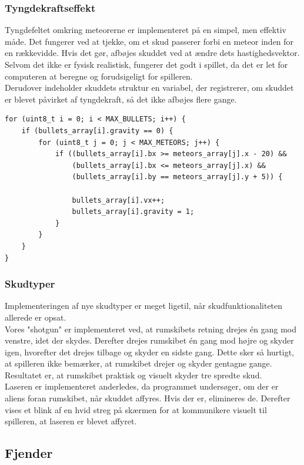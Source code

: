 \subsubsection{Tyngdekraftseffekt}
Tyngdefeltet omkring meteorerne er implementeret på en simpel, men effektiv måde. Det fungerer ved at tjekke, om et skud passerer forbi en meteor inden for en rækkevidde. Hvis det gør, afbøjes skuddet ved at ændre dets hastighedsvektor.\\
Selvom det ikke er fysisk realistisk, fungerer det godt i spillet, da det er let for computeren at beregne og forudsigeligt for spilleren.\\
Derudover indeholder skuddets struktur en variabel, der registrerer, om skuddet er blevet påvirket af tyngdekraft, så det ikke afbøjes flere gange.
\begin{lstlisting}[caption={Tyngdekraftseffekt kode}]
for (uint8_t i = 0; i < MAX_BULLETS; i++) {
    if (bullets_array[i].gravity == 0) {
        for (uint8_t j = 0; j < MAX_METEORS; j++) {
            if ((bullets_array[i].bx >= meteors_array[j].x - 20) &&
                (bullets_array[i].bx <= meteors_array[j].x) &&
                (bullets_array[i].by == meteors_array[j].y + 5)) {
                
                bullets_array[i].vx++;
                bullets_array[i].gravity = 1;
            }
        }
    }
}
\end{lstlisting}

\subsubsection{Skudtyper}
Implementeringen af nye skudtyper er meget ligetil, når skudfunktionaliteten allerede er opsat.\\
Vores "shotgun" er implementeret ved, at rumskibets retning drejes én gang mod venstre, idet der skydes. Derefter drejes rumskibet én gang mod højre og skyder igen, hvorefter det drejes tilbage og skyder en sidste gang. Dette sker så hurtigt, at spilleren ikke bemærker, at rumskibet drejer og skyder gentagne gange. Resultatet er, at rumskibet praktisk og visuelt skyder tre spredte skud.\\
Laseren er implementeret anderledes, da programmet undersøger, om der er aliens foran rumskibet, når skuddet affyres. Hvis der er, elimineres de. Derefter vises et blink af en hvid streg på skærmen for at kommunikere visuelt til spilleren, at laseren er blevet affyret.

\subsection{Fjender}
